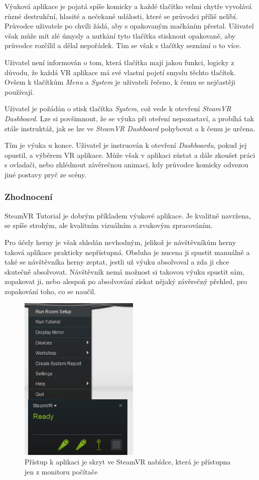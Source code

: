 Výuková aplikace je pojatá spíše komicky a každé tlačítko velmi chytře
vyvolává různé destrukční, hlasité a nečekané události, které se
průvodci příliš nelíbí. Průvodce uživatele po chvíli žádá, aby s opakovaným
mačkáním přestal. Uživatel však může mít zlé úmysly a nutkání tyto tlačítka
stisknout opakovaně, aby průvodce rozčílil a dělal nepořádek. Tím se
však s tlačítky seznámí o to více.

Uživatel není informován o tom, která tlačítka mají jakou funkci, logicky z
důvodu, že každá VR aplikace má své vlastní pojetí smyslu těchto
tlačítek. Ovšem k tlačítkům \emph{Menu} a \emph{System} je uživateli
řečeno, k čemu se nejčastěji používají.

Uživatel je požádán o stisk tlačítka \emph{System}, což vede k otevření
\emph{SteamVR Dashboard}. Lze si povšimnout, že se výuka při oteření
nepozastaví, a probíhá tak stále instruktáž, jak se lze ve \emph{SteamVR
Dashboard} pohybovat a k čemu je určena.

Tím je výuka u konce. Uživatel je instruován k otevření
\emph{Dashboardu}, pokud jej opustil, a výběrem VR aplikace. Může však v
aplikaci zůstat a dále zkoušet práci s ovladači, nebo zhlédnout
závěrečnou animaci, kdy průvodce komicky odvezou jiné postavy pryč ze
scény. \autocite{steamvrshuts}

\subsubsection{Zhodnocení}\label{zhodnocenuxed}

SteamVR Tutorial je dobrým příkladem výukové aplikace. Je kvalitně
navržena, se spíše strohým, ale kvalitním vizuálním a zvukovým
zpracováním.

Pro účely herny je však shledán nevhodným, jelikož je návštěvníkům herny
taková aplikace prakticky nepřístupná. Obsluha je nucena ji spustit
manuálně a také se návštěvníka herny zeptat, jestli už výuku absolvoval
a zda ji chce skutečně absolvovat. Návštěvník nemá možnost si takovou
výuku spustit sám, zopakovat ji, nebo alespoň po absolvování získat
nějaký závěrečný přehled, pro zopakování toho, co se naučil.

\begin{figure}[h!]
\centering
\includegraphics[height=8cm]{src/assets/hidden-menu.png}
\caption{Přístup k aplikaci je skryt ve SteamVR nabídce, která je
přístupna jen z monitoru počítače}
\end{figure}

